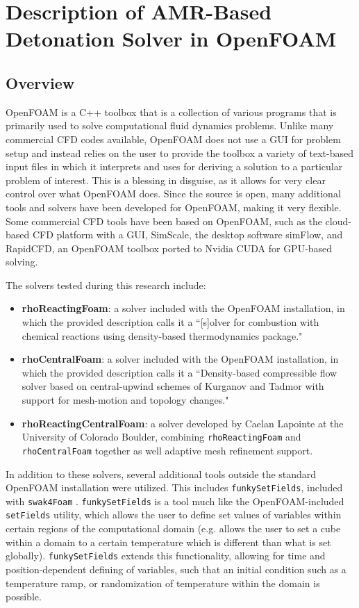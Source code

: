 \chapter{Description of AMR-Based Detonation Solver in OpenFOAM}
\label{math}

\section{Overview}
OpenFOAM is a C++ toolbox that is a collection of various programs that is primarily used to solve computational fluid dynamics problems. Unlike many commercial CFD codes available, OpenFOAM does not use a GUI for problem setup and instead relies on the user to provide the toolbox a variety of text-based input files in which it interprets and uses for deriving a solution to a particular problem of interest. This is a blessing in disguise, as it allows for very clear control over what OpenFOAM does. Since the source is open, many additional tools and solvers have been developed for OpenFOAM, making it very flexible. Some commercial CFD tools have been based on OpenFOAM, such as the cloud-based CFD platform with a GUI, SimScale\cite{simscale}, the desktop software simFlow\cite{simflow}, and RapidCFD\cite{rapidcfd}, an OpenFOAM toolbox ported to Nvidia CUDA\cite{cuda} for GPU-based solving. 

The solvers tested during this research include:
\begin{itemize}
    \item \textbf{rhoReactingFoam}: a solver included with the OpenFOAM installation, in which the provided description calls it a ``[s]olver for combustion with chemical reactions using density-based thermodynamics package."
    \item \textbf{rhoCentralFoam}: a solver included with the OpenFOAM installation, in which the provided description calls it a ``Density-based compressible flow solver based on central-upwind schemes of Kurganov and Tadmor with support for mesh-motion and topology changes."
    \item \textbf{rhoReactingCentralFoam}: a solver developed by Caelan Lapointe at the University of Colorado Boulder, combining \verb|rhoReactingFoam| and \verb|rhoCentralFoam| together as well adaptive mesh refinement support. 
\end{itemize}

In addition to these solvers, several additional tools outside the standard OpenFOAM installation were utilized. This includes \verb|funkySetFields|, included with \verb|swak4Foam| \cite{swak4foam}. \verb|funkySetFields| is a tool much like the OpenFOAM-included \verb|setFields| utility, which allows the user to define set values of variables within certain regions of the computational domain (e.g. allows the user to set a cube within a domain to a certain temperature which is different than what is set globally). \verb|funkySetFields| extends this functionality, allowing for time and position-dependent defining of variables, such that an initial condition such as a temperature ramp, or randomization of temperature within the domain is possible. 

